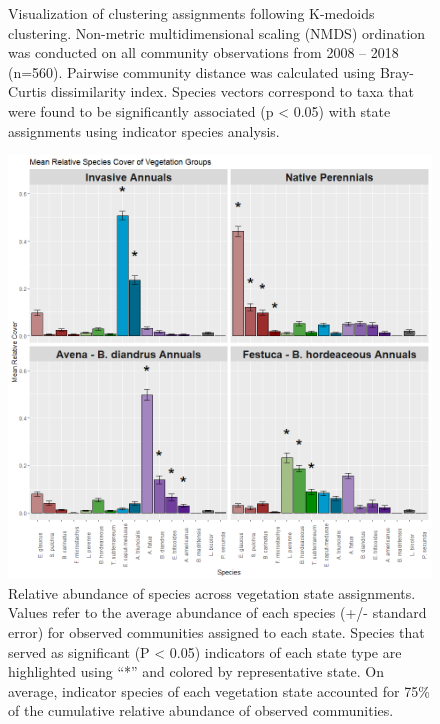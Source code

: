 \documentclass[twoside,12pt,final]{ucthesis-CA2012}
\begin{document}
\begin{ucmainmatter}
\begin{figure}
\caption{Visualization of clustering assignments following K-medoids clustering. Non-metric multidimensional scaling (NMDS) ordination was conducted on all community observations from 2008 -- 2018 (n=560). Pairwise community distance was calculated using Bray-Curtis dissimilarity index. Species vectors correspond to taxa that were found to be significantly associated (p \textless{} 0.05) with state assignments using indicator species analysis. \label{app-3-1}}
\end{figure}
\begin{figure}
\centering
\includegraphics[width=\textwidth,height=0.8\textheight]{figure/AppFig3_2.png}
\caption{Relative abundance of species across vegetation state assignments. Values refer to the average abundance of each species (+/- standard error) for observed communities assigned to each state. Species that served as significant (P \textless{} 0.05) indicators of each state type are highlighted using ``*'' and colored by representative state. On average, indicator species of each vegetation state accounted for 75\% of the cumulative relative abundance of observed communities. \label{app-3-2}}
\end{figure}
\begin{figure}
\centering

\end{figure}
\end{ucmainmatter}
\end{document}
